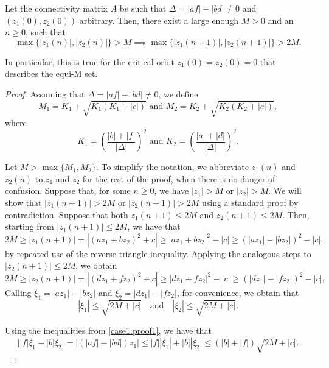 \documentclass[10pt,a4paper]{amsart}
\begin{document}
\begin{lemma} \label{case1}
Let the connectivity matrix $A$ be such that $\Delta = |a f| - |bd| \neq 0$ and $(z_1(0), z_2(0))$ arbitrary. Then, there exist a large enough $M > 0$ and an $n \ge 0$, such that
\[
\max\{|z_1(n)|, |z_2(n)|\} > M \implies \max\{|z_1(n + 1)|, |z_2(n + 1)|\} > 2 M.
\]

In particular, this is true for the critical orbit $z_1(0) = z_2(0) = 0$ that describes the
equi-M set.
\end{lemma}

\begin{proof}
Assuming that $\Delta = |af | - |bd | \neq 0$, we define
\begin{equation} \label{case1.m1m2}
M_1 = K_1 + \sqrt{K_1 (K_1 + |c|)}
\text{ and }
M_2 = K_2 + \sqrt{K_2(K_2 + |c|)},
\end{equation}
where
\[
K_1 = \left(\frac{|b| + |f|}{|\Delta|}\right)^2
\text{ and }
K_2 = \left(\frac{|a| + |d|}{|\Delta|}\right)^2.
\]

Let $M > \max\{M_1, M_2\}$. To simplify the notation, we abbreviate $z_1(n)$ and $z_2(n)$ to $z_1$ and $z_2$ for the rest of the proof, when there is no danger of confusion. Suppose that, for some $n \geq 0$, we have $|z_1| > M$ or $|z_2| > M$. We will show that $|z_1(n + 1)| > 2 M$ or $|z_2(n + 1)| > 2 M$ using a standard proof by contradiction. Suppose that both $z_1(n + 1) \leq 2M$ and $z_2(n + 1) \leq 2M$. Then, starting from $|z_1(n + 1)| \le 2 M$, we have that
\[
2 M
\geq |z_1(n + 1)| = |(a z_1 + b z_2)^2 + c|
\geq |a z_1 + b z_2|^2 - |c|
\geq (|a z_1| - |b z_2|)^2 - |c|,
\]
by repeated use of the reverse triangle inequality. Applying the analogous steps to $|z_2(n + 1)| \le 2 M$, we obtain
\[
2 M
\geq |z_2(n + 1)| = |(d z_1 + f z_2)^2 + c|
\geq |d z_1 + f z_2|^2 - |c|
\geq (|d z_1| - |f z_2|)^2 - |c|,
\]
Calling $\xi_1=|a z_1| - |b z_2|$ and $\xi_2 = |d z_1| - |f z_2|$, for convenience, we obtain that
\begin{equation} \label{case1.proof1}
    |\xi_1| \leq \sqrt{2M + |c|}
    \quad \text{and} \quad
    |\xi_2| \leq \sqrt{2M + |c|}.
\end{equation}

Using the inequalities from \eqref{case1.proof1}, we have that
\begin{equation*}
\big||f| \xi_1 - |b| \xi_2\big|
    = \big|(|a f| - |b d|) z_1\big|
    \leq |f| |\xi_1| + |b| |\xi_2|
    \leq (|b| + |f|) \sqrt{2M + |c|}.
\end{equation*}


\end{proof}
\end{document}
